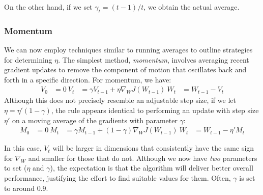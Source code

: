 On the other hand, if we set $\gamma_t = (t - 1) / t$, we obtain the actual average.

\subsubsection{Momentum}
We can now employ techniques similar to running averages to outline strategies for determining $\eta$. The simplest method, \textit{momentum}, involves averaging recent gradient updates to remove the component of motion that oscillates back and forth in a specific direction. For momentum, we have:
\begin{align*}
V_0 & = 0 \
V_t & = \gamma V_{t-1} + \eta \nabla_W J(W_{t-1}) \
W_t & = W_{t-1} - V_t
\end{align*}
Although this does not precisely resemble an adjustable step size, if we let $\eta = \eta'(1 - \gamma)$, the rule appears identical to performing an update with step size $\eta'$ on a moving average of the gradients with parameter $\gamma$:
\begin{align*}
M_0 & = 0 \
M_t & = \gamma M_{t-1} + (1 - \gamma) \nabla_W J(W_{t-1}) \
W_t & = W_{t-1} - \eta' M_t
\end{align*}

In this case, $V_t$ will be larger in dimensions that consistently have the same sign for $\nabla_{W}$ and smaller for those that do not. Although we now have \textit{two} parameters to set ($\eta$ and $\gamma$), the expectation is that the algorithm will deliver better overall performance, justifying the effort to find suitable values for them. Often, $\gamma$ is set to around $0.9$.


